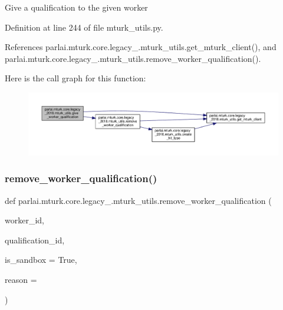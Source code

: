 \begin{DoxyVerb}Give a qualification to the given worker\end{DoxyVerb}
 

Definition at line 244 of file mturk\+\_\+utils.\+py.



References parlai.\+mturk.\+core.\+legacy\+\_.\+mturk\+\_\+utils.\+get\+\_\+mturk\+\_\+client(), and parlai.\+mturk.\+core.\+legacy\+\_.\+mturk\+\_\+utils.\+remove\+\_\+worker\+\_\+qualification().

Here is the call graph for this function\+:
\nopagebreak
\begin{figure}[H]
\begin{center}
\leavevmode
\includegraphics[width=350pt]{namespaceparlai_1_1mturk_1_1core_1_1legacy__2018_1_1mturk__utils_aaaf07be966ed2720b918f8dd2775e18a_cgraph}
\end{center}
\end{figure}
\mbox{\label{namespaceparlai_1_1mturk_1_1core_1_1legacy__2018_1_1mturk__utils_aeb2a9fb74d8d0bbfe744bb6d89bee910}} 
\subsubsection{\texorpdfstring{remove\+\_\+worker\+\_\+qualification()}{remove\_worker\_qualification()}}
{\footnotesize\ttfamily def parlai.\+mturk.\+core.\+legacy\+\_.\+mturk\+\_\+utils.\+remove\+\_\+worker\+\_\+qualification (\begin{DoxyParamCaption}\item[{}]{worker\+\_\+id,  }\item[{}]{qualification\+\_\+id,  }\item[{}]{is\+\_\+sandbox = {\ttfamily True},  }\item[{}]{reason = {\ttfamily \textquotesingle{}\textquotesingle{}} }\end{DoxyParamCaption})}


